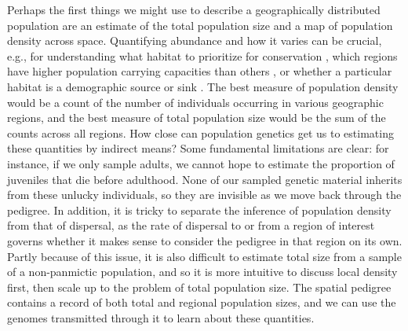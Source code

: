 \documentclass{ar-1col}
\begin{document}
Perhaps the first things we might use
to describe a geographically distributed population
are an estimate of the total population size
and a map of population density across space.
Quantifying abundance and how it varies
can be crucial, e.g., for understanding
what habitat to prioritize for conservation \citep{zipkin2018synthesizing}, 
which regions have higher population carrying capacities than others \citep{roughgarden1974}, 
or whether a particular habitat is a demographic source or sink 
\citep{pulliam1988sources}.
The best measure of population density
would be a count of the number of individuals occurring in various geographic regions, 
and the best measure of total population size would be the sum of the counts across all regions.
How close can population genetics get us to estimating these quantities by indirect means?
Some fundamental limitations are clear:
for instance, if we only sample adults,
we cannot hope to estimate the proportion of juveniles that die before adulthood.
None of our sampled genetic material inherits from these unlucky individuals,
so they are invisible as we move back through the pedigree.
In addition, it is tricky to separate the inference of population density 
from that of dispersal, 
as the rate of dispersal to or from a region of interest 
governs whether it makes sense to consider the pedigree in that region on its own.
Partly because of this issue, 
it is also difficult to estimate total size from a sample of a 
non-panmictic population, 
and so it is more intuitive to discuss local density first, 
then scale up to the problem of total population size.
The spatial pedigree contains a record of both total and regional population sizes, 
and we can use the genomes transmitted through it to learn about these quantities.
\end{document}
